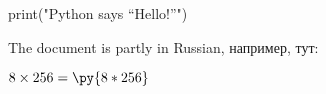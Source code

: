 \documentclass{article}
\newcommand{\pymultiply}[2]{\py{#1*#2}}
\begin{document}

\begin{pycode}
print("Python says ``Hello!''")
\end{pycode}

The document is partly in Russian, например, тут:

$8 \times 256 = \pymultiply{8}{256}$
\end{document}
